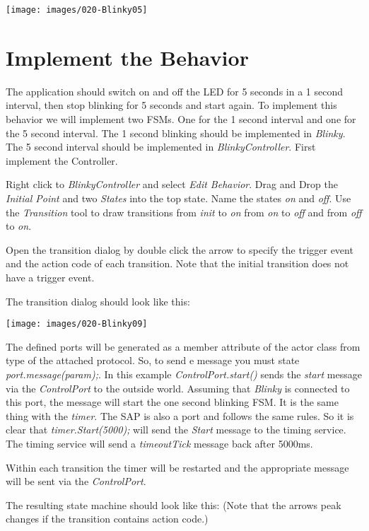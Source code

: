 \texttt{[image: images/020-Blinky05]}

\section{Implement the Behavior}

The application should switch on and off the LED for 5 seconds in a 1 second interval, then stop blinking for 5 seconds and start again. To implement this behavior we will implement two FSMs. One for the 1 second interval and one for the 5 second interval. The 1 second blinking should be implemented in \textit{Blinky}. The 5 second interval should be implemented in \textit{BlinkyController}. First implement the Controller.

Right click to \textit{BlinkyController} and select \textit{Edit Behavior}.
Drag and Drop the \textit{Initial Point} and two \textit{States} into the top state. Name the states \textit{on} and \textit{off}. 
Use the \textit{Transition} tool to draw transitions from \textit{init} to \textit{on} from \textit{on} to \textit{off} and from \textit{off} to \textit{on}.

Open the transition dialog by double click the arrow to specify the trigger event and the action code of each transition. Note that the initial transition does not have a trigger event.

The transition dialog should look like this:

\texttt{[image: images/020-Blinky09]}

The defined ports will be generated as a member attribute of the actor class from type of the attached protocol. So, to send e message you must state \textit{port.message(param);}. In this example \textit{ControlPort.start()} sends the \textit{start} message via the \textit{ControlPort} to the outside world. Assuming that \textit{Blinky} is connected to this port, the message will start the one second blinking FSM. It is the same thing with the \textit{timer}. The SAP is also a port and follows the same rules. So it is clear that \textit{timer.Start(5000);} will send the \textit{Start} message to the timing service. The timing service will send a \textit{timeoutTick} message back after 5000ms.

Within each transition the timer will be restarted and the appropriate message will be sent via the \textit{ControlPort}. 

The resulting state machine should look like this:
(Note that the arrows peak changes if the transition contains action code.)

